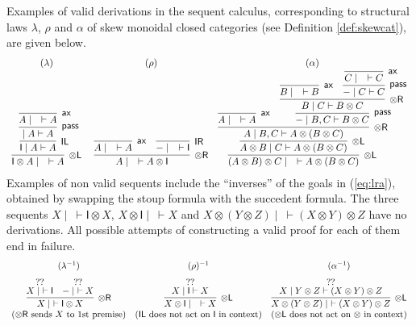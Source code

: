 \documentclass[submission,copyright,creativecommons]{eptcs}
\theoremstyle{definition}
\newcommand{\tl}{\otimes \mathsf{L}}
\newcommand{\tr}{\otimes \mathsf{R}}
\newcommand{\pass}{\mathsf{pass}}
\newcommand{\unitl}{\mathsf{IL}}
\newcommand{\unitr}{\mathsf{IR}}
\newcommand{\ax}{\mathsf{ax}}
\newcommand{\ot}{\otimes}
\newcommand{\I}{\mathsf{I}}
\begin{document}
Examples of valid derivations in the sequent calculus, corresponding to structural laws $\lambda$, $\rho$ and $\alpha$ of skew monoidal closed categories (see Definition \ref{def:skewcat}), are given below. %
\begin{equation}\label{eq:lra}
  \begin{array}{c@{\;\quad}cc}
  (\lambda) & (\rho) & (\alpha) \\
  \infer[\tl]{\I \ot A \mid \quad \vdash A}{
    \infer[\unitl]{\I \mid A \vdash A}{
      \infer[\pass]{ \mid A \vdash A}{
        \infer[\ax]{A \mid \quad \vdash A}{}
      }
    }
  }
  &
  \infer[\tr]{A \mid \quad \vdash A \ot \I}{
    \infer[\ax]{A \mid \quad \vdash A}{}
    &
    \infer[\unitr]{- \mid \quad \vdash \I}{}
  }
  &
  \infer[\tl]{(A \ot B) \ot C \mid \quad \vdash A \ot (B \ot C)}{
    \infer[\tl]{A \ot B \mid C \vdash A \ot (B \ot C)}{
      \infer[\tr]{A \mid B , C \vdash A \ot (B \ot C)}{
        \infer[\ax]{A \mid \quad \vdash A}{}
        &
        \infer[\pass]{- \mid B , C \vdash B \ot C}{
          \infer[\tr]{B \mid C \vdash B \ot C}{
            \infer[\ax]{B \mid \quad \vdash B}{}
            &
            \infer[\pass]{- \mid C \vdash C}{
              \infer[\ax]{C \mid \quad \vdash C}{}
            }
          }
        }
      }
    }
  }
  \end{array}
\end{equation}
Examples of non valid sequents include the ``inverses'' of the goals in (\ref{eq:lra}), obtained by swapping the stoup formula with the succedent formula.
The three sequents $X \mid ~ \vdash \I \ot X$, $X \ot \I \mid ~ \vdash X$ and $X \ot (Y \ot Z) \mid ~ \vdash (X \ot Y) \ot Z$ have no derivations. All possible attempts of constructing a valid proof for each of them end in failure.
\begin{displaymath}
  \begin{array}{ccc}
  (\lambda^{-1}) & (\rho)^{-1} & (\alpha^{-1}) \\[6pt]
    \infer[\tr]{X \mid ~\vdash \I \ot X}{
      \deduce[??]{X \mid ~ \vdash \I}{
      }
      &
      \deduce[??]{- \mid ~ \vdash X}{
      }
    }
    &
    \infer[\tl]{X \ot \I \mid \quad \vdash X}{
      \deduce{X \mid \I \vdash X}{??}
    }
    &
    \infer[\tl]{X \ot (Y \ot Z) \mid ~\vdash (X \ot Y) \ot Z}{
      \deduce{X \mid Y \ot Z \vdash (X \ot Y) \ot Z}{??}
    } \\
    (\text{$\tr$ sends $X$ to 1st premise}) &
    (\text{$\unitl$ does not act on $\I$ in context}) &
    (\text{$\tl$ does not act on $\ot$ in context})
  \end{array}
\end{displaymath}
\end{document}
